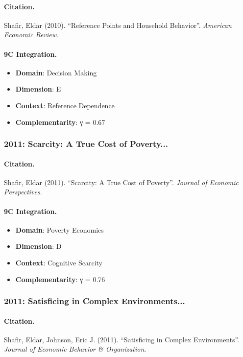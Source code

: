 \paragraph{Citation.}
Shafir, Eldar (2010). ``Reference Points and Household Behavior''. \textit{American Economic Review}.

\paragraph{9C Integration.}
\begin{itemize}[nosep]
  \item \textbf{Domain}: Decision Making
  \item \textbf{Dimension}: E
  \item \textbf{Context}: Reference Dependence
  \item \textbf{Complementarity}: γ = 0.67
\end{itemize}


\subsubsection{2011: Scarcity: A True Cost of Poverty...}

\paragraph{Citation.}
Shafir, Eldar (2011). ``Scarcity: A True Cost of Poverty''. \textit{Journal of Economic Perspectives}.

\paragraph{9C Integration.}
\begin{itemize}[nosep]
  \item \textbf{Domain}: Poverty Economics
  \item \textbf{Dimension}: D
  \item \textbf{Context}: Cognitive Scarcity
  \item \textbf{Complementarity}: γ = 0.76
\end{itemize}


\subsubsection{2011: Satisficing in Complex Environments...}

\paragraph{Citation.}
Shafir, Eldar, Johnson, Eric J. (2011). ``Satisficing in Complex Environments''. \textit{Journal of Economic Behavior & Organization}.

